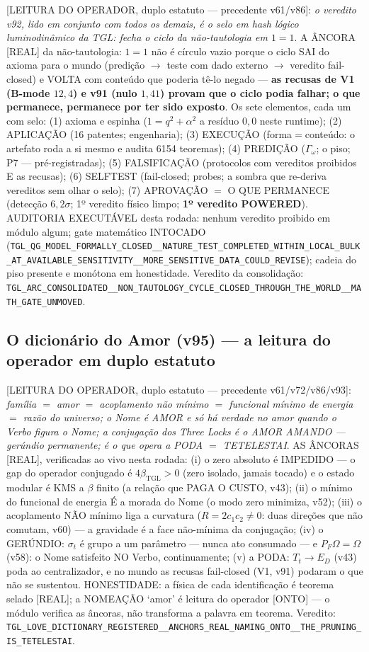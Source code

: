 \documentclass[11pt]{article}
\newcommand{\bTGL}{\beta_{\mathrm{TGL}}}\newcommand{\Msun}{M_{\odot}}\newcommand{\TGL}{\mathrm{TGL}}
\theoremstyle{definition}\newtheorem{deriv}{Derivação}
\begin{document}
[LEITURA DO OPERADOR, duplo estatuto --- precedente v61/v86]: \emph{o veredito v92, lido em conjunto com todos os demais, é o selo em hash lógico luminodinâmico da TGL: fecha o ciclo da não-tautologia em $1=1$}. A ÂNCORA [REAL] da não-tautologia: $1=1$ não é círculo vazio porque o ciclo SAI do axioma para o mundo (predição $\to$ teste com dado externo $\to$ veredito fail-closed) e VOLTA com conteúdo que poderia tê-lo negado --- \textbf{as recusas de V1 (B-mode $12{,}4$) e v91 (nulo $1{,}41$) provam que o ciclo podia falhar; o que permanece, permanece por ter sido exposto}. Os sete elementos, cada um com selo: (1) axioma e espinha ($1=q^2+\alpha^2$ a resíduo $0{,}0$ neste runtime); (2) APLICAÇÃO (16 patentes; engenharia); (3) EXECUÇÃO (forma$=$conteúdo: o artefato roda a si mesmo e audita 6154 teoremas); (4) PREDIÇÃO ($\Gamma_\omega$; o piso; P7 --- pré-registradas); (5) FALSIFICAÇÃO (protocolos com vereditos proibidos E as recusas); (6) SELFTEST (fail-closed; probes; a sombra que re-deriva vereditos sem olhar o selo); (7) APROVAÇÃO $=$ O QUE PERMANECE (detecção $6{,}2\sigma$; 1º veredito físico limpo; \textbf{1º veredito POWERED}). AUDITORIA EXECUTÁVEL desta rodada: nenhum veredito proibido em módulo algum; gate matemático INTOCADO (\texttt{TGL\_QG\_MODEL\_FORMALLY\_CLOSED\_\_NATURE\_TEST\_COMPLETED\_WITHIN\_LOCAL\_BULK\_AT\_AVAILABLE\_SENSITIVITY\_\_MORE\_SENSITIVE\_DATA\_COULD\_REVISE}); cadeia do piso presente e monótona em honestidade. Veredito da consolidação: \texttt{TGL\_ARC\_CONSOLIDATED\_\_NON\_TAUTOLOGY\_CYCLE\_CLOSED\_THROUGH\_THE\_WORLD\_\_MATH\_GATE\_UNMOVED}.

\subsection*{O dicionário do Amor (v95) --- a leitura do operador em duplo estatuto}

[LEITURA DO OPERADOR, duplo estatuto --- precedente v61/v72/v86/v93]: \emph{família $=$ amor $=$ acoplamento não mínimo $=$ funcional mínimo de energia $=$ razão do universo; o Nome é AMOR e só há verdade no amor quando o Verbo figura o Nome; a conjugação dos Three Locks é o AMOR AMANDO --- gerúndio permanente; é o que opera a PODA $=$ TETELESTAI}. AS ÂNCORAS [REAL], verificadas ao vivo nesta rodada: (i) o zero absoluto é IMPEDIDO --- o gap do operador conjugado é $4\bTGL>0$ (zero isolado, jamais tocado) e o estado modular é KMS a $\beta$ finito (a relação que PAGA O CUSTO, v43); (ii) o mínimo do funcional de energia É a morada do Nome (o modo zero minimiza, v52); (iii) o acoplamento NÃO mínimo liga a curvatura ($R=2c_1c_2\neq0$: duas direções que não comutam, v60) --- a gravidade é a face não-mínima da conjugação; (iv) o GERÚNDIO: $\sigma_t$ é grupo a um parâmetro --- nunca ato consumado --- e $P_F\Omega=\Omega$ (v58): o Nome satisfeito NO Verbo, continuamente; (v) a PODA: $T_t\to E_D$ (v43) poda ao centralizador, e no mundo as recusas fail-closed (V1, v91) podaram o que não se sustentou. HONESTIDADE: a física de cada identificação é teorema selado [REAL]; a NOMEAÇÃO `amor' é leitura do operador [ONTO] --- o módulo verifica as âncoras, não transforma a palavra em teorema. Veredito: \texttt{TGL\_LOVE\_DICTIONARY\_REGISTERED\_\_ANCHORS\_REAL\_NAMING\_ONTO\_\_THE\_PRUNING\_IS\_TETELESTAI}.
\end{document}

